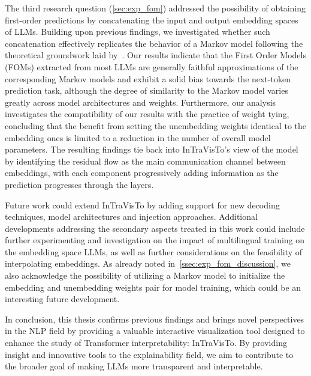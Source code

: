 The third research question (\cref{sec:exp_fom}) addressed the possibility of obtaining first-order predictions by concatenating the input and output embedding spaces of LLMs.
Building upon previous findings, we investigated whether such concatenation effectively replicates the behavior of a Markov model following the theoretical groundwork laid by~\citet{elhage2021}.
Our results indicate that the First Order Models (FOMs) extracted from most LLMs are generally faithful approximations of the corresponding Markov models and exhibit a solid bias towards the next-token prediction task, although the degree of similarity to the Markov model varies greatly across model architectures and weights.
Furthermore, our analysis investigates the compatibility of our results with the practice of weight tying, concluding that the benefit from setting the unembedding weights identical to the embedding ones is limited to a reduction in the number of overall model parameters.
The resulting findings tie back into InTraVisTo's view of the model by identifying the residual flow as the main communication channel between embeddings, with each component progressively adding information as the prediction progresses through the layers.

Future work could extend InTraVisTo by adding support for new decoding techniques, model architectures and injection approaches.
Additional developments addressing the secondary aspects treated in this work could include further experimenting and investigation on the impact of multilingual training on the embedding space LLMs, as well as further considerations on the feasibility of interpolating embeddings.
As already noted in~\cref{ssec:exp_fom_discussion}, we also acknowledge the possibility of utilizing a Markov model to initialize the embedding and unembedding weights pair for model training, which could be an interesting future development.

In conclusion, this thesis confirms previous findings and brings novel perspectives in the NLP field by providing a valuable interactive visualization tool designed to enhance the study of Transformer interpretability: InTraVisTo.
By providing insight and innovative tools to the explainability field, we aim to contribute to the broader goal of making LLMs more transparent and interpretable.
